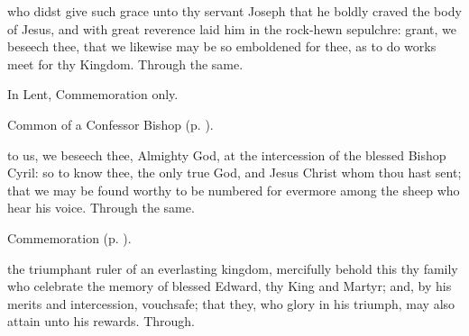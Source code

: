 \memorialCollect\label{ArimatheanCollect}
 who didst give such grace unto thy servant Joseph that he boldly craved the body of Jesus, and with great reverence laid him in the rock-hewn sepulchre: grant, we beseech thee, that we likewise may be so emboldened for thee, as to do works meet for thy Kingdom. Through the same.



\begin{rubric}
	In Lent, Commemoration only.
\end{rubric}

\begin{rubric}
	Common of a Confessor Bishop (p. \pageref{CommonConfessorBishop}).
\end{rubric}

\label{CyrilCollect}
 to us, we beseech thee, Almighty God, at the intercession of the blessed Bishop Cyril: so to know thee, the only true God, and Jesus Christ whom thou hast sent; that we may be found worthy to be numbered for evermore among the sheep who hear his voice. Through the same.

\begin{rubric}
	Commemoration  (p. \pageref{EdwardCollect}).
\end{rubric}


\clearpage
{}


\memorialCollect\label{EdwardCollect}
 the triumphant ruler of an everlasting kingdom, mercifully behold this thy family who celebrate the memory of blessed Edward, thy King and Martyr; and, by his merits and intercession, vouchsafe; that they, who glory in his triumph, may also attain unto his rewards. Through.




